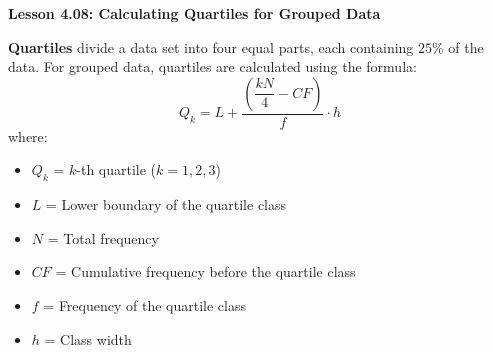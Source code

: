 \begin{center}
\textbf{Lesson 4.08: Calculating Quartiles for Grouped Data}
\end{center}

\vspace*{-1.5ex}

\noindent \textbf{Quartiles} divide a data set into four equal parts, each containing \(25\%\) of the data. For grouped data, quartiles are calculated using the formula:  
\[
Q_k = L + \dfrac{\left(\dfrac{kN}{4} - CF\right)}{f} \cdot h
\]
where:  
\begin{itemize}
    \item \(Q_k\) = \(k\)-th quartile (\(k = 1, 2, 3\))
    \item \(L\) = Lower boundary of the quartile class
    \item \(N\) = Total frequency
    \item \(CF\) = Cumulative frequency before the quartile class 
    \item \(f\) = Frequency of the quartile class
    \item \(h\) = Class width
\end{itemize}

